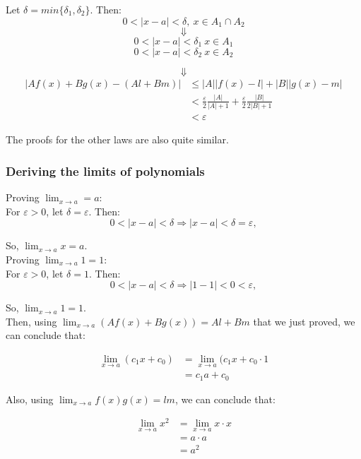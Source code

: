 \documentclass[11pt]{article}
\begin{document}
Let \(\delta = min \{\delta_1, \delta_2\}\). Then:
\[0 < |x - a| < \delta, \ x \in A_1 \cap A_2\]
\[\Downarrow\]
\[0 < |x - a| < \delta_1 \ x \in A_1\]
\[0 < |x - a| < \delta_2 \ x \in A_2\]

\[\Downarrow\]
\begin{align*}
|Af(x) + Bg(x) - (Al + Bm)| &\le |A||f(x) - l| + |B||g(x) -m| \\
&< \frac{\varepsilon}{2} \frac{|A|}{|A| + 1} + \frac{\varepsilon}{2} \frac{|B|}{2|B| + 1} \\
&< \varepsilon
\end{align*}

The proofs for the other laws are also quite similar.

\newpage

\subsubsection{Deriving the limits of polynomials}
\label{sec:org1effe54}

Proving \(\lim_{x \rightarrow a} = a\):
\\[0pt]

For \(\varepsilon > 0\), let \(\delta = \varepsilon\). Then:
\[0 < |x - a| < \delta \Rightarrow |x - a| < \delta = \varepsilon,\]

So, \(\lim_{x \rightarrow a} x = a\).
\\[0pt]

Proving \(\lim_{x \rightarrow a} 1 = 1\):
\\[0pt]

For \(\varepsilon > 0\), let \(\delta = 1\). Then:
\[0 < |x - a| < \delta \Rightarrow |1 - 1| < 0 < \varepsilon,\]

So, \(\lim_{x \rightarrow a} 1 = 1\).
\\[0pt]

Then, using \(\lim_{x \rightarrow a}(Af(x) + Bg(x)) = Al + Bm\) that we just proved, we can conclude that:

\begin{align*}
\lim_{x \rightarrow a} (c_1x + c_0) &= \lim_{x \rightarrow a}(c_1x + c_0 \cdot 1 \\
&= c_1a + c_0
\end{align*}

Also, using \(\lim_{x \rightarrow a} f(x)g(x) = lm\), we can conclude that:

\begin{align*}
\lim_{x \rightarrow a} x^2 &= \lim_{x \rightarrow a} x \cdot x \\
&= a \cdot a \\
&= a^2
\end{align*}
\end{document}
